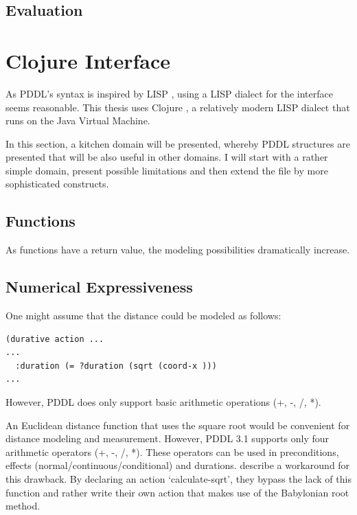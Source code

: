 \documentclass[11pt]{report}
\begin{document}
\subsection{Evaluation}
\label{sec-4-2-3}

\section{Clojure Interface}
\label{sec-4-3}
As PDDL's syntax is inspired by LISP \parencite[64]{fox2003pddl2},
using a LISP dialect for the interface seems reasonable. This thesis
uses Clojure \parencite{hickey2008clojure}, a relatively modern LISP
dialect that runs on the Java Virtual Machine.

In this section, a kitchen domain will be presented, whereby PDDL
structures are presented that will be also useful in other domains. I
will start with a rather simple domain, present possible limitations
and then extend the file by more sophisticated constructs.
\subsection{Functions}
\label{sec-4-3-1}
As functions have a return value, the modeling possibilities
dramatically increase.

\subsection{Numerical Expressiveness}
\label{sec-4-3-2}
One might assume that the distance could be modeled as follows:

\begin{verbatim}
(durative action ...
...
  :duration (= ?duration (sqrt (coord-x )))
...
\end{verbatim}

However, PDDL does only support basic arithmetic operations (+, -, /, *).

An Euclidean distance function that uses the square root would be
convenient for distance modeling and measurement. However, PDDL 3.1
supports only four arithmetic operators (+, -, /, *). These
operators can be used in preconditions, effects
(normal/continuous/conditional) and durations.
\textcite{parkinson2012increasing} describe a workaround for this
drawback. By declaring an action `calculate-sqrt', they bypass the
lack of this function and rather write their own action that makes use
of the Babylonian root method.
\end{document}
